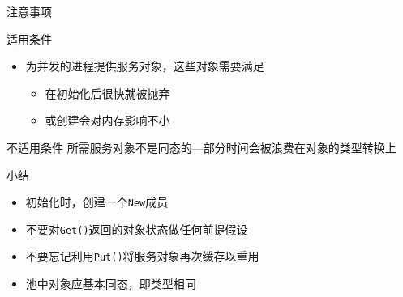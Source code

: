 \begin{frame}{注意事项}
\begin{exampleblock}{适用条件}
    \begin{itemize}
        \item 为并发的进程提供服务对象，这些对象需要满足
            \begin{itemize}
                \item 在初始化后很快就被抛弃
                \item 或创建会对内存影响不小
            \end{itemize}
    \end{itemize}
\end{exampleblock}    

\begin{alertblock}{不适用条件}
   所需服务对象不是同态的---部分时间会被浪费在对象的类型转换上 
\end{alertblock}
\end{frame}

\begin{frame}{\Pool 小结}
    \begin{itemize}
        \item 初始化\Pool 时，创建一个\texttt{New}成员
        \item 不要对\texttt{Get()}返回的对象状态做任何前提假设
        \item 不要忘记利用\texttt{Put()}将服务对象再次缓存以重用
        \item 池中对象应基本同态，即类型相同    
    \end{itemize}
\end{frame}